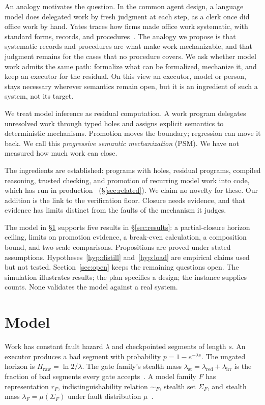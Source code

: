 \documentclass[11pt]{article}
\theoremstyle{definition}
\theoremstyle{remark}
\newcommand{\lst}{\lambda_{\mathrm{st}}}
\newcommand{\lred}{\lambda_{\mathrm{red}}}
\newcommand{\lirr}{\lambda_{\mathrm{irr}}}
\newcommand{\Hraw}{H_{\mathrm{raw}}}
\newcommand{\simF}{\sim_F}
\newcommand{\SigF}{\Sigma_F}
\newcommand{\lF}{\lambda_F}
\begin{document}
An analogy motivates the question. In the common agent design, a language model does delegated work by
fresh judgment at each step, as a clerk once did office work by hand. Yates traces how firms made
office work systematic, with standard forms, records, and procedures~\cite{yates1989}. The analogy we propose is that systematic records and procedures are
what make work mechanizable, and that judgment remains for the cases that no procedure covers.
We ask whether model work admits the same path: formalize what can be formalized,
mechanize it, and keep an executor for the residual. On this view an executor, model or person,
stays necessary wherever semantics remain open, but it is an ingredient of such a system, not its
target.

We treat model inference as residual computation. A work program delegates unresolved work through
typed holes and assigns explicit semantics to deterministic mechanisms. Promotion moves the
boundary; regression can move it back. We call this \emph{progressive semantic mechanization}
(PSM). We have not measured how much work can close.

The ingredients are established: programs with holes, residual programs, compiled reasoning,
trusted checking, and promotion of recurring model work into code, which has run in
production~\cite{malik2026crystallization} (\S\ref{sec:related}). We claim no novelty for these.
Our addition is the link to the verification floor. Closure needs evidence, and that evidence
has limits distinct from the faults of the mechanism it judges.

The model in \S\ref{sec:model} supports five results in \S\ref{sec:results}: a partial-closure
horizon ceiling, limits on promotion evidence, a break-even calculation, a composition bound,
and two scale comparisons. Propositions are proved under stated assumptions.
Hypotheses~\ref{hyp:distill} and~\ref{hyp:load} are empirical claims used but not tested.
Section~\ref{sec:open} keeps the remaining questions open.
The simulation illustrates results; the plan specifies a design; the instance supplies counts.
None validates the model against a real system.

\section{Model}\label{sec:model}
Work has constant fault hazard $\lambda$ and checkpointed segments of length $s$.
An executor produces a bad segment with probability $p=1-e^{-\lambda s}$.
The ungated horizon is $\Hraw=\ln2/\lambda$.
The gate family's stealth mass $\lst=\lred+\lirr$ is the fraction of bad segments every gate
accepts~\cite{matijasevic2026n1}.
A model family $F$ has representation $r_F$, indistinguishability relation $\simF$, stealth set
$\SigF$, and stealth mass $\lF=\mu(\SigF)$ under fault distribution
$\mu$~\cite{matijasevic2026gg}.
\end{document}
